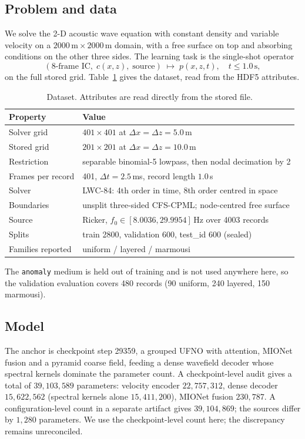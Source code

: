 \documentclass[11pt,a4paper]{article}
\begin{document}
\subsection{Problem and data}

We solve the 2-D acoustic wave equation with constant density and variable velocity on a
$2000\,\mathrm{m}\times2000\,\mathrm{m}$ domain, with a free surface on top and absorbing
conditions on the other three sides. The learning task is the single-shot operator
\[
(\text{8-frame IC},\; c(x,z),\; \text{source}) \;\longmapsto\; p(x,z,t),\quad t \le 1.0\,\mathrm{s},
\]
on the full stored grid. Table~\ref{tab:data} gives the dataset, read from the HDF5 attributes.

\begin{table}[t]
\centering
\caption{Dataset. Attributes are read directly from the stored file.}
\label{tab:data}
\begin{tabular}{ll}
\toprule
Property & Value \\
\midrule
Solver grid & $401\times401$ at $\Delta x=\Delta z=5.0$\,m \\
Stored grid & $201\times201$ at $\Delta x=\Delta z=10.0$\,m \\
Restriction & separable binomial-5 lowpass, then nodal decimation by 2 \\
Frames per record & 401, $\Delta t = 2.5$\,ms, record length $1.0$\,s \\
Solver & LWC-84: 4th order in time, 8th order centred in space \\
Boundaries & unsplit three-sided CFS-CPML; node-centred free surface \\
Source & Ricker, $f_0 \in [8.0036, 29.9954]$\,Hz over 4003 records \\
Splits & train 2800, validation 600, test\_id 600 (sealed) \\
Families reported & uniform / layered / marmousi \\
\bottomrule
\end{tabular}
\end{table}

The \texttt{anomaly} medium is held out of training and is not used anywhere here, so the
validation evaluation covers 480 records (90 uniform, 240 layered, 150 marmousi).

\subsection{Model}

The anchor is checkpoint step 29359, a grouped UFNO with attention, MIONet fusion and a
pyramid coarse field, feeding a dense wavefield decoder whose spectral kernels dominate the
parameter count. A checkpoint-level audit gives a total of $39{,}103{,}589$ parameters:
velocity encoder $22{,}757{,}312$, dense decoder $15{,}622{,}562$ (spectral kernels alone
$15{,}411{,}200$), MIONet fusion $230{,}787$. A configuration-level count in a separate
artifact gives $39{,}104{,}869$; the sources differ
by $1{,}280$ parameters. We use the checkpoint-level count here; the discrepancy remains unreconciled.
\end{document}
